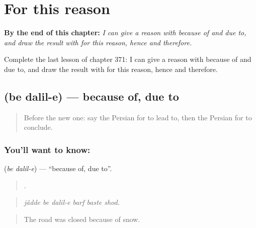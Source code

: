 
\chapter{For this reason}
\label{ch:fa-for-this-reason}

\begin{chapteropening}
\textbf{By the end of this chapter:} \emph{I can give a reason with because of and due to, and draw the result with for this reason, hence and therefore.}

Complete the last lesson of chapter 371: I can give a reason with because of and due to, and draw the result with for this reason, hence and therefore.
\end{chapteropening}

\section[\texorpdfstring{\fa{به} \fa{دلیل} (be dalil-e)}{به دلیل (be dalil-e)}]{  (be dalil-e) — because of, due to}

\label{lesson:FA-C371-be-dalil-e}



\begin{quote}
Before the new one: say the Persian for to lead to, then the Persian for to conclude.
\end{quote}

\subsection*{You'll want to know:  }
\textbf{ } (\emph{be dalil-e}) — \textquotedblleft{}because of, due to\textquotedblright{}.

\begin{quote}
     .
\end{quote}

\begin{quote}
\emph{jâdde be dalil-e barf baste shod.}
\end{quote}

\begin{quote}
The road was closed because of snow.
\end{quote}

